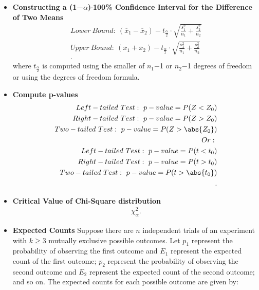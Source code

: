 \documentclass{report}
\begin{document}
\begin{itemize}
        \item \textbf{Constructing a (1−$\alpha$)$\cdot  $100\% Confidence Interval for the Difference of Two Means}
            \begin{align*}
                Lower\ Bound:\ (\overline{x}_{1} - \overline{x}_{2}) - t_{\frac{\alpha}{2}} \cdot \sqrt{\frac{s_{1}^{2}}{n_{1}} + \frac{s_{2}^{2}}{n_{2}}} \\
                Upper\ Bound:\ (\overline{x}_{1} + \overline{x}_{2}) - t_{\frac{\alpha}{2}} \cdot \sqrt{\frac{s_{1}^{2}}{n_{1}} + \frac{s_{2}^{2}}{n_{2}}} \\
            .\end{align*}
            where $t_{\frac{\alpha}{2}} $ is computed using the smaller of $n_{1} $−1 or $n_{2}$−1 degrees of freedom or using the degrees of freedom formula.
        \item \textbf{Compute p-values}
          \begin{align*}
              Left-tailed\ Test:\ p-value = P(Z < Z_{0}) \\
              Right-tailed\ Test:\ p-value = P(Z > Z_{0}) \\
              Two-tailed\ Test:\ p-value = P(Z > \abs{Z_{0}}) \\
              Or:\ \\
              Left-tailed\ Test:\ p-value = P(t < t_{0}) \\
              Right-tailed\ Test:\ p-value = P(t > t_{0}) \\
              Two-tailed\ Test:\ p-value = P(t > \abs{t_{0}}) \\
          .\end{align*}
        \item \textbf{Critical Value of Chi-Square distribution}
            \begin{align*}
                \chi^{2}_{\alpha}
            .\end{align*}
        \item \textbf{Expected Counts}
            Suppose there are $n$ independent trials of an experiment with $k \geq 3$ mutually exclusive possible outcomes. Let $p_1$ represent the probability of observing the first outcome and $E_1$ represent the expected count of the first outcome; $p_2$ represent the probability of observing the second outcome and $E_2$ represent the expected count of the second outcome; and so on.
            \bigbreak \noindent 
            The expected counts for each possible outcome are given by:
            \begin{align*}

\end{align*}
\end{itemize}
\end{document}
